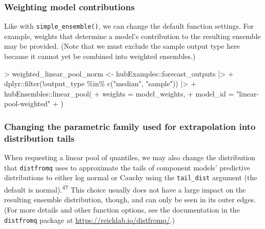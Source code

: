\documentclass[
]{article}
\newenvironment{Shaded}{\begin{snugshade}}{\end{snugshade}}
\newcommand{\AttributeTok}[1]{\textcolor[rgb]{0.40,0.45,0.13}{#1}}
\newcommand{\FunctionTok}[1]{\textcolor[rgb]{0.28,0.35,0.67}{#1}}
\newcommand{\NormalTok}[1]{\textcolor[rgb]{0.00,0.23,0.31}{#1}}
\newcommand{\OtherTok}[1]{\textcolor[rgb]{0.00,0.23,0.31}{#1}}
\newcommand{\SpecialCharTok}[1]{\textcolor[rgb]{0.37,0.37,0.37}{#1}}
\newcommand{\StringTok}[1]{\textcolor[rgb]{0.13,0.47,0.30}{#1}}
\begin{document}
\subsubsection{Weighting model
contributions}\label{weighting-model-contributions-1}

Like with \texttt{simple\_ensemble()}, we can change the default
function settings. For example, weights that determine a model's
contribution to the resulting ensemble may be provided. (Note that we
must exclude the sample output type here because it cannot yet be
combined into weighted ensembles.)

\begin{Shaded}
\begin{Highlighting}[]
\SpecialCharTok{\textgreater{}}\NormalTok{ weighted\_linear\_pool\_norm }\OtherTok{\textless{}{-}}\NormalTok{ hubExamples}\SpecialCharTok{::}\NormalTok{forecast\_outputs }\SpecialCharTok{|\textgreater{}}
\SpecialCharTok{+}\NormalTok{   dplyr}\SpecialCharTok{::}\FunctionTok{filter}\NormalTok{(}\SpecialCharTok{!}\NormalTok{output\_type }\SpecialCharTok{\%in\%} \FunctionTok{c}\NormalTok{(}\StringTok{"median"}\NormalTok{, }\StringTok{"sample"}\NormalTok{)) }\SpecialCharTok{|\textgreater{}}
\SpecialCharTok{+}\NormalTok{   hubEnsembles}\SpecialCharTok{::}\FunctionTok{linear\_pool}\NormalTok{(}
\SpecialCharTok{+}     \AttributeTok{weights =}\NormalTok{ model\_weights,}
\SpecialCharTok{+}     \AttributeTok{model\_id =} \StringTok{"linear{-}pool{-}weighted"}
\SpecialCharTok{+}\NormalTok{ )}
\end{Highlighting}
\end{Shaded}

\subsubsection{Changing the parametric family used for extrapolation
into distribution
tails}\label{changing-the-parametric-family-used-for-extrapolation-into-distribution-tails}

When requesting a linear pool of quantiles, we may also change the
distribution that \texttt{distfromq} uses to approximate the tails of
component models' predictive distributions to either log normal or
Cauchy using the \texttt{tail\_dist} argument (the default is
normal).\textsuperscript{47} This choice usually does not have a large
impact on the resulting ensemble distribution, though, and can only be
seen in its outer edges. (For more details and other function options,
see the documentation in the \texttt{distfromq} package at
\url{https://reichlab.io/distfromq/}.)
\end{document}
